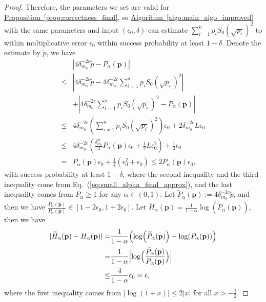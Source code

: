 \documentclass[journal]{IEEEtran}
\newcommand{\eq}[1]{Eq.~(\ref{eq:#1})}
\newcommand{\prop}[1]{\hyperref[prop:#1]{Proposition~\ref*{prop:#1}}}
\newcommand{\algo}[1]{\hyperref[algo:#1]{Algorithm~\ref*{algo:#1}}}
\begin{document}
\begin{proof}
    Therefore, the parameters we set are valid for \prop{correctness_final}, so \algo{main_algo_improved} with the same parameters and input $(\epsilon_{0},\delta)$ can estimate $\sum_{i=1}^n p_i S_0(\sqrt{p_i})^2$ to within multiplicative error $\epsilon_{0}$ within success probability at least $1-\delta$. Denote the estimate by $\tilde{p}$, we have
    \begin{align}
        &|4\delta^{-2c}_{m_0}\tilde{p}-P_{\alpha}(\mathbf{p})| \nonumber \\
        \le & |4\delta^{-2c}_{m_0}\tilde{p}-4\delta^{-2c}_{m_0}\sum_{i=1}^n p_i S_0(\sqrt{p_i})^2| \nonumber \\
        & + |4\delta^{-2c}_{m_0}\sum_{i=1}^n p_i S_0(\sqrt{p_i})^2-P_{\alpha}(\mathbf{p})|\nonumber\\
        \le & 4\delta^{-2c}_{m_0}(\sum_{i=1}^n p_i S_0(\sqrt{p_i})^2)\epsilon_{0} +2\delta^{-2c}_{m_0}L\epsilon_{0}\nonumber\\
        \le & 4\delta^{-2c}_{m_0}(\frac{\delta^{2c}_{m_0}}{4}P_{\alpha}(\mathbf{p})\epsilon_{0} + \frac{1}{2}L\epsilon_{0}^2)+\frac{1}{4}\epsilon_{0}\nonumber\\
        = &P_{\alpha}(\mathbf{p})\epsilon_{0} + \frac{1}{4}(\epsilon_{0}^2 + \epsilon_{0})\le 2P_{\alpha}(\mathbf{p})\epsilon_{0},
    \end{align}
    with success probability at least $1-\delta$, where the second inequality and the third inequality come from \eq{small_alpha_final_approx}, and the last inequality comes from $P_{\alpha} \ge 1$ for any $\alpha \in (0,1)$.  Let $\widetilde{P}_{\alpha}(\mathbf{p}) := 4\delta^{-2c}_{m_0}\tilde{p}$, and then we have $\frac{\widetilde{P}_{\alpha}(\mathbf{p})}{P_{\alpha}(\mathbf{p})}\in[1-2\epsilon_{0},1+2\epsilon_{0}]$. Let $\widetilde{H}_\alpha(\mathbf{p})=\frac{1}{1-\alpha}\log(\widetilde{P}_{\alpha}(\mathbf{p}))$, then we have
    \begin{align}
        |\widetilde{H}_\alpha(\mathbf{p})-H_\alpha(\mathbf{p})| = & \frac{1}{1-\alpha}\Bigl(\log(\widetilde{P}_{\alpha}(\mathbf{p}))-\log(P_{\alpha}(\mathbf{p}))\Bigr)\nonumber \\ 
        = & \frac{1}{1-\alpha}\Bigl|\log\Bigl(\frac{\widetilde{P}_\alpha(\mathbf{p})}{P_\alpha(\mathbf{p})}\Bigr)\Bigr|\nonumber \\ \le & \frac{4}{1-\alpha}\epsilon_{0} = \epsilon,
    \end{align}
    where the first inequality comes from $|\log(1+x)| \le 2|x|$ for all $x > -\frac{1}{2}$.
    

\end{proof}
\end{document}
